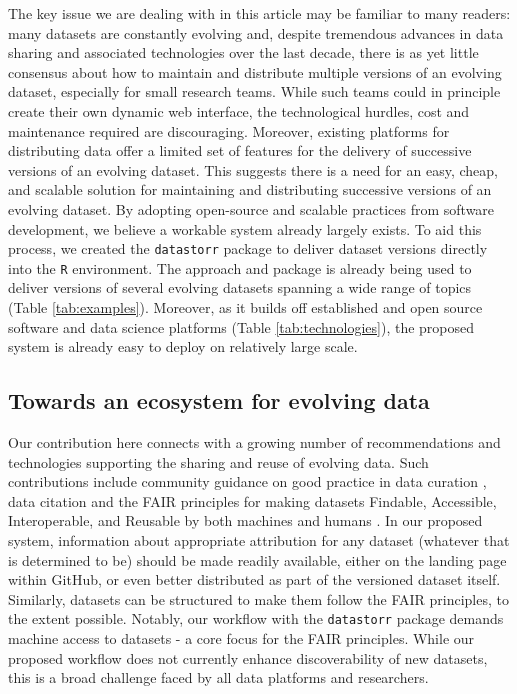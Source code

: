 \documentclass[a4paper,num-refs]{assets/oup-contemporary}
\begin{document}
The key issue we are dealing with in this article may be familiar to many readers: many datasets are constantly evolving and, despite tremendous advances in data sharing and associated technologies over the last decade, there is as yet little consensus about how to maintain and distribute multiple versions of an evolving dataset, especially for small research teams. While such teams could in principle create their own dynamic web interface, the technological hurdles, cost and maintenance required are discouraging. Moreover, existing platforms for distributing data offer a limited set of features for the delivery of successive versions of an evolving dataset. This suggests there is a need for an easy, cheap, and scalable solution for maintaining and distributing successive versions of an evolving dataset. By adopting open-source and scalable practices from software development, we believe a workable system already largely exists. To aid this process, we created the \texttt{datastorr} package to deliver dataset versions directly into the \texttt{R} environment. The approach and package is already being used to deliver versions of several evolving datasets spanning a wide range of topics (Table \ref{tab:examples}). Moreover, as it builds off established and open source software and data science platforms (Table \ref{tab:technologies}), the proposed system is already easy to deploy on relatively large scale.

\subsection{Towards an ecosystem for evolving data}

Our contribution here connects with a growing number of recommendations and technologies supporting the sharing and reuse of evolving data. Such contributions include community guidance on good practice in data curation \cite{Goodman-2014, Lowndes-2017}, data citation \cite{Force11-2014} and the FAIR principles for making datasets Findable, Accessible, Interoperable, and Reusable by both machines and humans \cite{Wilkinson-2016}. In our proposed system, information about appropriate attribution for any dataset  (whatever that is determined to be) should be made readily available, either on the landing page within GitHub, or even better distributed as part of the versioned dataset itself. Similarly, datasets can be structured to make them follow the FAIR principles, to the extent possible. Notably, our workflow with the \texttt{datastorr} package demands machine access to datasets - a core focus for the FAIR principles. While our proposed workflow does not currently enhance discoverability of new datasets, this is a broad challenge faced by all data platforms and researchers.
\end{document}
